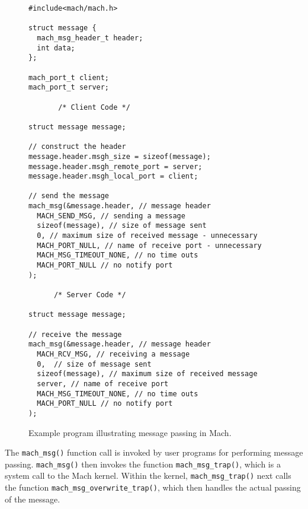 \begin{figure}[h!]
\centering
\begin{verbatim}
#include<mach/mach.h>
 
struct message {
  mach_msg_header_t header;
  int data;
};
 
mach_port_t client;
mach_port_t server;
 
       /* Client Code */
 
struct message message;
 
// construct the header
message.header.msgh_size = sizeof(message);
message.header.msgh_remote_port = server;
message.header.msgh_local_port = client;
 
// send the message
mach_msg(&message.header, // message header
  MACH_SEND_MSG, // sending a message
  sizeof(message), // size of message sent
  0, // maximum size of received message - unnecessary
  MACH_PORT_NULL, // name of receive port - unnecessary
  MACH_MSG_TIMEOUT_NONE, // no time outs
  MACH_PORT_NULL // no notify port
);
 
      /* Server Code */
 
struct message message;
 
// receive the message
mach_msg(&message.header, // message header
  MACH_RCV_MSG, // receiving a message
  0,  // size of message sent
  sizeof(message), // maximum size of received message
  server, // name of receive port
  MACH_MSG_TIMEOUT_NONE, // no time outs
  MACH_PORT_NULL // no notify port
);
\end{verbatim}
\caption{Example program illustrating message passing in Mach.}\label{fig:mach-message-passing}
\end{figure}

The \texttt{mach\_msg()} function call is invoked by user programs for performing message passing. \texttt{mach\_msg()} then invokes the function \texttt{mach\_msg\_trap()}, which is a system call to the Mach kernel. Within the kernel, \texttt{mach\_msg\_trap()} next calls the function \texttt{mach\_msg\_overwrite\_trap()}, which then handles the actual passing of the message.

